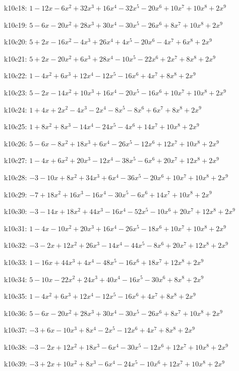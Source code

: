 k10c18: $ 1-12x-6x^{2}+32x^{3}+16x^{4}-32x^{5}-20x^{6}+10x^{7}+10x^{8}+2x^{9} $ 

k10c19: $ 5-6x-20x^{2}+28x^{3}+30x^{4}-30x^{5}-26x^{6}+8x^{7}+10x^{8}+2x^{9} $ 

k10c20: $ 5+2x-16x^{2}-4x^{3}+26x^{4}+4x^{5}-20x^{6}-4x^{7}+6x^{8}+2x^{9} $ 

k10c21: $ 5+2x-20x^{2}+6x^{3}+28x^{4}-10x^{5}-22x^{6}+2x^{7}+8x^{8}+2x^{9} $ 

k10c22: $ 1-4x^{2}+6x^{3}+12x^{4}-12x^{5}-16x^{6}+4x^{7}+8x^{8}+2x^{9} $ 

k10c23: $ 5-2x-14x^{2}+10x^{3}+16x^{4}-20x^{5}-16x^{6}+10x^{7}+10x^{8}+2x^{9} $ 

k10c24: $ 1+4x+2x^{2}-4x^{3}-2x^{4}-8x^{5}-8x^{6}+6x^{7}+8x^{8}+2x^{9} $ 

k10c25: $ 1+8x^{2}+8x^{3}-14x^{4}-24x^{5}-4x^{6}+14x^{7}+10x^{8}+2x^{9} $ 

k10c26: $ 5-6x-8x^{2}+18x^{3}+6x^{4}-26x^{5}-12x^{6}+12x^{7}+10x^{8}+2x^{9} $ 

k10c27: $ 1-4x+6x^{2}+20x^{3}-12x^{4}-38x^{5}-6x^{6}+20x^{7}+12x^{8}+2x^{9} $ 

k10c28: $ -3-10x+8x^{2}+34x^{3}+6x^{4}-36x^{5}-20x^{6}+10x^{7}+10x^{8}+2x^{9} $ 

k10c29: $ -7+18x^{2}+16x^{3}-16x^{4}-30x^{5}-6x^{6}+14x^{7}+10x^{8}+2x^{9} $ 

k10c30: $ -3-14x+18x^{2}+44x^{3}-16x^{4}-52x^{5}-10x^{6}+20x^{7}+12x^{8}+2x^{9} $ 

k10c31: $ 1-4x-10x^{2}+20x^{3}+16x^{4}-26x^{5}-18x^{6}+10x^{7}+10x^{8}+2x^{9} $ 

k10c32: $ -3-2x+12x^{2}+26x^{3}-14x^{4}-44x^{5}-8x^{6}+20x^{7}+12x^{8}+2x^{9} $ 

k10c33: $ 1-16x+44x^{3}+4x^{4}-48x^{5}-16x^{6}+18x^{7}+12x^{8}+2x^{9} $ 

k10c34: $ 5-10x-22x^{2}+24x^{3}+40x^{4}-16x^{5}-30x^{6}+8x^{8}+2x^{9} $ 

k10c35: $ 1-4x^{2}+6x^{3}+12x^{4}-12x^{5}-16x^{6}+4x^{7}+8x^{8}+2x^{9} $ 

k10c36: $ 5-6x-20x^{2}+28x^{3}+30x^{4}-30x^{5}-26x^{6}+8x^{7}+10x^{8}+2x^{9} $ 

k10c37: $ -3+6x-10x^{3}+8x^{4}-2x^{5}-12x^{6}+4x^{7}+8x^{8}+2x^{9} $ 

k10c38: $ -3-2x+12x^{2}+18x^{3}-6x^{4}-30x^{5}-12x^{6}+12x^{7}+10x^{8}+2x^{9} $ 

k10c39: $ -3+2x+10x^{2}+8x^{3}-6x^{4}-24x^{5}-10x^{6}+12x^{7}+10x^{8}+2x^{9} $ 

